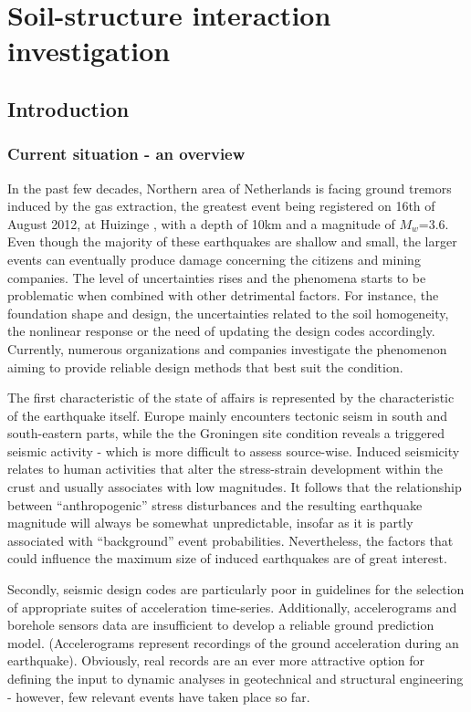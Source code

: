 \documentclass[12pt,a4paper]{report}
\begin{document}
\tableofcontents

\part{Soil-structure interaction investigation}
\chapter{Introduction}
\section{Current situation - an overview}
In the past few decades, Northern area of Netherlands is facing ground tremors induced by the gas extraction, the greatest event being registered on 16th of August 2012, at Huizinge \cite{dost2013august}, with a depth of 10km and a magnitude of $M_w$=3.6. Even though the majority of these earthquakes are shallow and small, the larger events can eventually produce damage concerning the citizens and mining companies. The level of uncertainties rises and the phenomena starts to be problematic when combined with other detrimental factors. For instance, the foundation shape and design, the uncertainties related to the soil homogeneity, the nonlinear response or the need of updating the design codes accordingly. Currently, numerous organizations and companies investigate the phenomenon aiming to provide reliable design methods that best suit the condition. 

The first characteristic of the state of affairs is represented by the characteristic of the earthquake itself. Europe mainly encounters tectonic seism in south and south-eastern parts, while the the Groningen site condition reveals a triggered seismic activity - which is more difficult to assess source-wise. Induced seismicity relates to human activities that alter the stress-strain development within the crust and usually associates with low magnitudes. It follows that the relationship between “anthropogenic” stress disturbances and the resulting earthquake magnitude will always be somewhat unpredictable, insofar as it is partly associated with “background” event probabilities. Nevertheless, the factors that could influence the maximum size of induced earthquakes are of great interest. 

Secondly, seismic design codes are particularly poor in guidelines for the selection of appropriate suites of acceleration time-series. Additionally, accelerograms and borehole sensors data are insufficient to develop a reliable ground prediction model. (Accelerograms represent recordings of the ground acceleration during an earthquake). Obviously, real records are an ever more attractive option for defining the input to dynamic analyses in geotechnical and structural engineering - however, few relevant events have taken place so far. 
\end{document}
